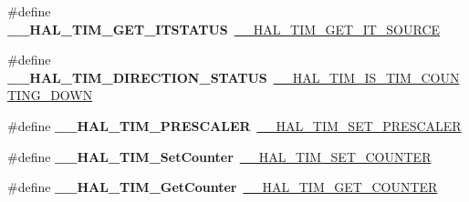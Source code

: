 \begin{DoxyCompactItemize}
\mbox{\label{group___h_a_l___t_i_m___aliased___macros_ga5b35f7cd15ac31c7b1a9596ac8521f36}} 
\#define {\bfseries \+\_\+\+\_\+\+H\+A\+L\+\_\+\+T\+I\+M\+\_\+\+G\+E\+T\+\_\+\+I\+T\+S\+T\+A\+T\+US}~\hyperlink{group___t_i_m___exported___macros_ga644babf93470a6eee6bce8906c4da5c5}{\+\_\+\+\_\+\+H\+A\+L\+\_\+\+T\+I\+M\+\_\+\+G\+E\+T\+\_\+\+I\+T\+\_\+\+S\+O\+U\+R\+CE}
\item 
\mbox{\label{group___h_a_l___t_i_m___aliased___macros_ga76886ef4a5712e8627ea09ff564cdff2}} 
\#define {\bfseries \+\_\+\+\_\+\+H\+A\+L\+\_\+\+T\+I\+M\+\_\+\+D\+I\+R\+E\+C\+T\+I\+O\+N\+\_\+\+S\+T\+A\+T\+US}~\hyperlink{group___t_i_m___exported___macros_gac73f5e7669d92971830481e7298e98ba}{\+\_\+\+\_\+\+H\+A\+L\+\_\+\+T\+I\+M\+\_\+\+I\+S\+\_\+\+T\+I\+M\+\_\+\+C\+O\+U\+N\+T\+I\+N\+G\+\_\+\+D\+O\+WN}
\item 
\mbox{\label{group___h_a_l___t_i_m___aliased___macros_ga64fdbe2a68fc8459071ee0dcb9096e34}} 
\#define {\bfseries \+\_\+\+\_\+\+H\+A\+L\+\_\+\+T\+I\+M\+\_\+\+P\+R\+E\+S\+C\+A\+L\+ER}~\hyperlink{group___t_i_m___exported___macros_gafdc5a06eab07e0c24e729fd492bdb27c}{\+\_\+\+\_\+\+H\+A\+L\+\_\+\+T\+I\+M\+\_\+\+S\+E\+T\+\_\+\+P\+R\+E\+S\+C\+A\+L\+ER}
\item 
\mbox{\label{group___h_a_l___t_i_m___aliased___macros_ga23ef14334077dc01d9e6d8bfa6614260}} 
\#define {\bfseries \+\_\+\+\_\+\+H\+A\+L\+\_\+\+T\+I\+M\+\_\+\+Set\+Counter}~\hyperlink{group___t_i_m___exported___macros_ga9746ac75e4cd25cec1a9ebac8cb82b97}{\+\_\+\+\_\+\+H\+A\+L\+\_\+\+T\+I\+M\+\_\+\+S\+E\+T\+\_\+\+C\+O\+U\+N\+T\+ER}
\item 
\mbox{\label{group___h_a_l___t_i_m___aliased___macros_ga074ff6af2efe776a0e76622bf8d4c85a}} 
\#define {\bfseries \+\_\+\+\_\+\+H\+A\+L\+\_\+\+T\+I\+M\+\_\+\+Get\+Counter}~\hyperlink{group___t_i_m___exported___macros_gaf1af08014b9d06efbbb091d58d47c8ba}{\+\_\+\+\_\+\+H\+A\+L\+\_\+\+T\+I\+M\+\_\+\+G\+E\+T\+\_\+\+C\+O\+U\+N\+T\+ER}
\item 
\mbox{\label{group___h_a_l___t_i_m___aliased___macros_ga8857297381807be432e6b6eb98fdb591}} 

\end{DoxyCompactItemize}
